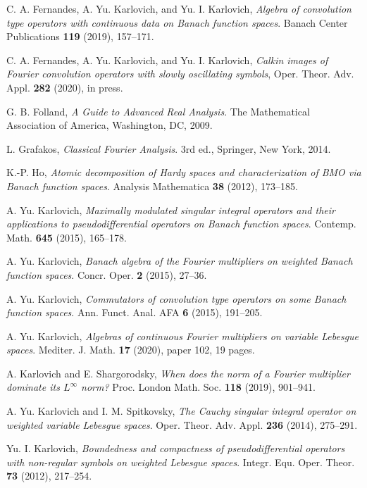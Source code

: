 \documentclass[reqno]{amsproc}
\theoremstyle{definition}
\theoremstyle{remark}
\numberwithin{equation}{section}
\begin{document}
\begin{thebibliography}{99}
C. A. Fernandes, A. Yu. Karlovich, and Yu. I. Karlovich, 
\textit{Algebra of convolution type operators with continuous data on 
Banach function spaces}. 
Banach Center Publications \textbf{119} (2019), 157--171.

C. A. Fernandes, A. Yu. Karlovich, and Yu. I. Karlovich,
\textit{Calkin images of Fourier convolution operators with slowly 
oscillating symbols},
Oper. Theor. Adv. Appl. \textbf{282} (2020), in press.

G. B. Folland,
\textit{A Guide to Advanced Real Analysis}.
The Mathematical Association of America,
Washington, DC, 2009.

L. Grafakos, 
\textit{Classical Fourier Analysis}. 3rd ed.,
Springer, New York, 2014.

K.-P. Ho,
\textit{Atomic decomposition of Hardy spaces and
characterization of BMO via Banach function spaces}.
Analysis Mathematica \textbf{38} (2012), 173--185.

A. Yu. Karlovich, 
\textit{Maximally modulated singular integral operators and their applications
to pseudodifferential operators on Banach function spaces}.
Contemp. Math. \textbf{645} (2015), 165--178.

A. Yu. Karlovich,
\textit{Banach algebra of the Fourier multipliers on weighted Banach 
function spaces}.
Concr. Oper. \textbf{2} (2015), 27--36.

A. Yu. Karlovich,
\textit{Commutators of convolution type operators on some Banach function 
spaces}.
Ann. Funct. Anal. AFA \textbf{6} (2015), 191--205.

A. Yu. Karlovich, 
\textit{Algebras of continuous Fourier multipliers on variable Lebesgue spaces}.
Mediter. J. Math. \textbf{17} (2020), paper 102, 19 pages.

A. Karlovich and E. Shargorodsky,
\textit{When does the norm of a Fourier multiplier dominate its $L^\infty$ norm?}
Proc. London Math. Soc. \textbf{118} (2019), 901--941.

A. Yu. Karlovich and I. M. Spitkovsky, 
\textit{The Cauchy singular integral operator on weighted variable Lebesgue 
spaces}.
Oper. Theor. Adv. Appl. \textbf{236} (2014), 275--291.

Yu. I. Karlovich, 
\textit{Boundedness and compactness of pseudodifferential operators with
non-regular symbols on weighted Lebesgue spaces}.
Integr. Equ. Oper. Theor. \textbf{73} (2012), 217--254.


\end{thebibliography}
\end{document}
